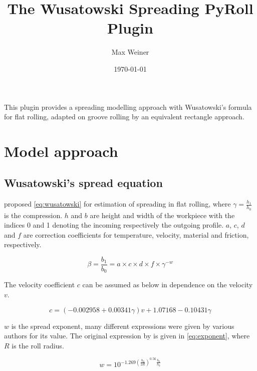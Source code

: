 \documentclass[11pt]{PyRollDocs}
\begin{document}
    \title{The Wusatowski Spreading PyRoll Plugin}
    \author{Max Weiner}
    \date{\today}

    \maketitle

    This plugin provides a spreading modelling approach with Wusatowski's formula for flat rolling, adapted on groove rolling by an equivalent rectangle approach.


    \section{Model approach}\label{sec:model-approach}

    \subsection{Wusatowski's spread equation}\label{subsec:wusatowski's-spread-equation}

    \textcite{Wusatowski1969} proposed \autoref{eq:wusatowski} for estimation of spreading in flat rolling,
    where $\gamma = \frac{h_1}{h_0}$ is the compression. $h$ and $b$ are height and width of the workpiece with the indices
    0 and 1 denoting the incoming respectively the outgoing profile. $a$, $c$, $d$ and $f$ are correction
    coefficients for temperature, velocity, material and friction, respectively.

    \begin{equation}
        \beta = \frac{b_1}{b_0} = a \times c \times d \times f \times \gamma^{-w}
        \label{eq:wusatowski}
    \end{equation}

    \noindent The velocity coefficient $c$ can be assumed as below in dependence on the velocity $v$.

    \begin{equation}
        c = \left(-0.002958 + 0.00341 \gamma \right) v + 1.07168 - 0.10431 \gamma
        \label{eq:velocity-coefficient}
    \end{equation}

    $w$ is the spread exponent, many different expressions were given by various authors for its value.
    The original expression by \textcite{Wusatowski1969} is given in \autoref{eq:exponent}, where $R$ is the roll radius.

    \begin{equation}
        w = 10^{ \num{-1.269} \left( \frac{h_0}{2 R} \right)^{\num{0.56}} \frac{b_0}{h_0} }
        \label{eq:exponent}
    \end{equation}
\end{document}
